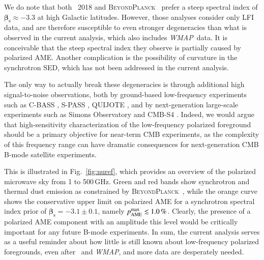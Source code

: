 \documentclass[twocolumn]{aa}
\def\WMAP{\textit{WMAP}}
\newcommand{\BP}{\textsc{BeyondPlanck}}
\begin{document}
We do note that both \Planck\ 2018 \citep{planck2016-l05} and
\BP\ \citep{bp01,bp14} prefer a steep spectral index of $\boldsymbol{\beta_{\mathrm{s}}} \approx
-3.3$ at high Galactic latitudes. However, those analyses consider only LFI data, and are therefore
susceptible to even stronger degeneracies than what is observed in the
current analysis, which also includes \WMAP\ data. It is conceivable
that the steep spectral index they observe is partially caused by
polarized AME. Another complication is the possibility of curvature in
the synchrotron SED, which has not been addressed in the current
analysis.

The only way to actually break these degeneracies is through
additional high signal-to-noise observations, both by ground-based
low-frequency experiments such as C-BASS \citep{jew2019}, S-PASS \citep{Carretti:2019}, QUIJOTE \citep{genovasantos2015}, and by
next-generation large-scale experiments such as Simons Observatory \citep{SO2019}
and CMB-S4 \citep{cmbs4}. Indeed, we would argue that high-sensitivity
characterization of the low-frequency polarized foreground should be a
primary objective for near-term CMB experiments, as the complexity of
this frequency range can have dramatic consequences for
next-generation CMB B-mode satellite experiments.

This is illustrated in Fig.~\ref{fig:nuref}, which provides an
overview of the polarized microwave sky from 1 to 500\,GHz. Green and
red bands show synchrotron and thermal dust emission as constrained by
\BP\ \citep{bp14}, while the orange curve shows the conservative upper limit on
polarized AME for a synchrotron spectral index prior of $\boldsymbol{\beta_{\mathrm{s}}}=-3.1\pm0.1$, namely
$p_{\mathrm{AME}}^{\rm max}\lesssim1.0\,\%$. Clearly, the presence of
a polarized AME component with an amplitude this level
would be critically important for any future B-mode experiments. In
sum, the current analysis serves as a useful reminder about how little
is still known about low-frequency polarized foregrounds, even after
\Planck\ and \WMAP, and more data are desperately needed.






\end{document}
